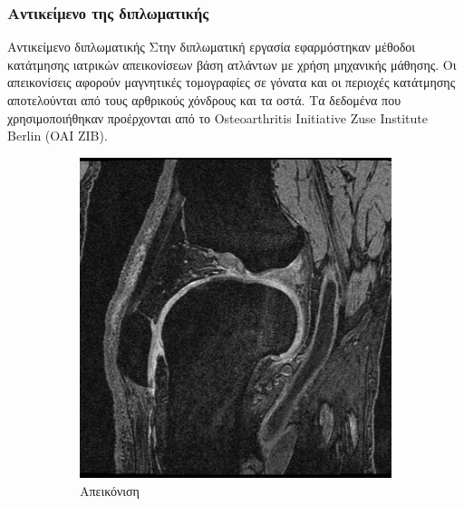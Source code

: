 \documentclass{beamer}
\begin{document}
\begin{frame}
\frametitle{Αντικείμενο της διπλωματικής}
\begin{block}{Αντικείμενο διπλωματικής}
Στην διπλωματική εργασία εφαρμόστηκαν μέθοδοι κατάτμησης ιατρικών απεικονίσεων
βάση ατλάντων με χρήση μηχανικής μάθησης. Οι απεικονίσεις αφορούν μαγνητικές
τομογραφίες σε γόνατα και οι περιοχές κατάτμησης αποτελούνται από τους
αρθρικούς χόνδρους και τα οστά. Τα δεδομένα που χρησιμοποιήθηκαν προέρχονται
από το Osteoarthritis Initiative Zuse Institute Berlin (OAI ZIB).
\end{block}

\begin{figure}[H]
    \centering

    \begin{subfigure}[t]{0.22\linewidth}
    \includegraphics[width=\linewidth]{original_1.png}
    \caption{Απεικόνιση}
    \end{subfigure}
    \begin{subfigure}[t]{0.22\linewidth}

\end{subfigure}
\end{figure}
\end{frame}
\end{document}
